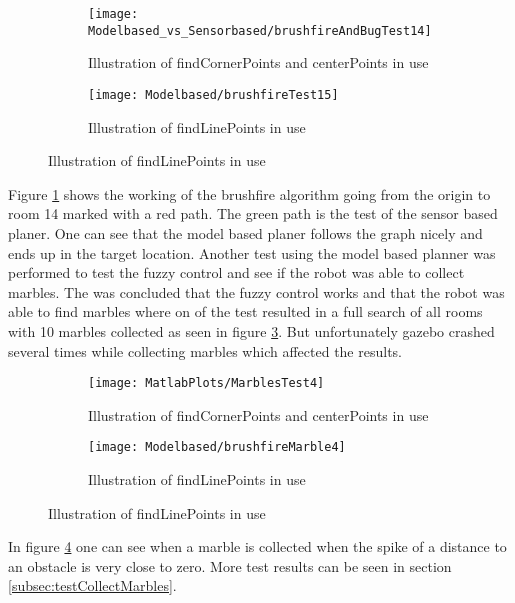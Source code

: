 \documentclass[../Head/Main.tex]{subfiles}
\begin{document}
  \begin{figure}[H]
   \begin{subfigure}[b]{0.49\textwidth}
    \centering
    \texttt{[image: Modelbased\_vs\_Sensorbased/brushfireAndBugTest14]}
    \caption{Illustration of findCornerPoints and centerPoints in use}
    \label{fig:brushfireToRoom14}
  \end{subfigure}
  \hfill
   \begin{subfigure}[b]{0.49\textwidth}
    \centering
    \texttt{[image: Modelbased/brushfireTest15]}
    \caption{Illustration of findLinePoints in use}
    \label{fig:brushfireCompletePath}
  \end{subfigure}
  \end{figure}  

Figure \ref{fig:brushfireToRoom14} shows the working of the brushfire algorithm going from the origin to room 14 marked with a red path. The green path is the test of the sensor based planer. One can see that the model based planer follows the graph nicely and ends up in the target location. Another test using the model based planner was performed to test the fuzzy control and see if the robot was able to collect marbles. The was concluded that the fuzzy control works and that the robot was able to find marbles where on of the test resulted in a full search of all rooms with 10 marbles collected as seen in figure \ref{fig:brushfireCompletePath}. But unfortunately gazebo crashed several times while collecting marbles which affected the results.
  \begin{figure}[H]
   \begin{subfigure}[b]{0.49\textwidth}
    \centering
    \texttt{[image: MatlabPlots/MarblesTest4]}
    \caption{Illustration of findCornerPoints and centerPoints in use}
    \label{fig:matlabPlotMarbletest14}
  \end{subfigure}
  \hfill
   \begin{subfigure}[b]{0.49\textwidth}
    \centering
    \texttt{[image: Modelbased/brushfireMarble4]}
    \caption{Illustration of findLinePoints in use}
    \label{fig:brushfireMarbleFindingTest}
  \end{subfigure}
  \end{figure}  

In figure \ref{fig:matlabPlotMarbletest14} one can see when a marble is collected when the spike of a distance to an obstacle is very close to zero. More test results can be seen in section \ref{subsec:testCollectMarbles}.
\end{document}
